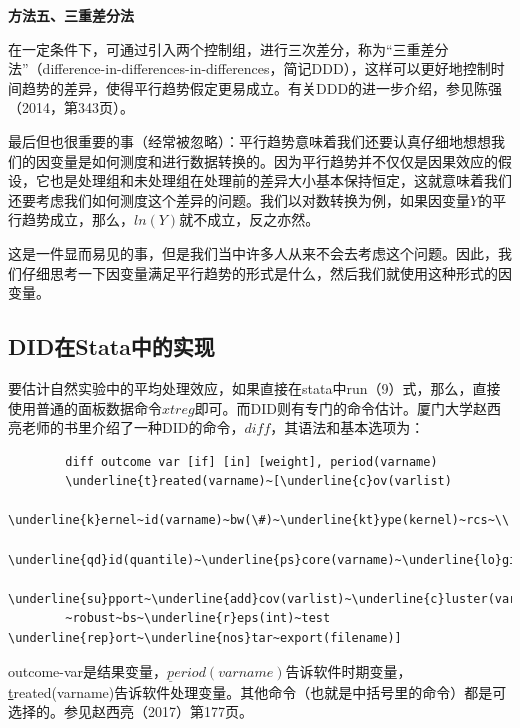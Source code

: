 \documentclass[cn,12pt,math=newtx,citestyle=gb7714-2015,bibstyle=gb7714-2015]{elegantbook}
\begin{document}
	\textbf{方法五、三重差分法}
	
	在一定条件下，可通过引入两个控制组，进行三次差分，称为“三重差分法”（difference-in-differences-in-differences，简记DDD），这样可以更好地控制时间趋势的差异，使得平行趋势假定更易成立。有关DDD的进一步介绍，参见陈强（2014，第343页）。
	
	最后但也很重要的事（经常被忽略）：平行趋势意味着我们还要认真仔细地想想我们的因变量是如何测度和进行数据转换的。因为平行趋势并不仅仅是因果效应的假设，它也是处理组和未处理组在处理前的差异大小基本保持恒定，这就意味着我们还要考虑我们如何测度这个差异的问题。我们以对数转换为例，如果因变量$Y$的平行趋势成立，那么，$ln(Y)$就不成立，反之亦然。
	
	这是一件显而易见的事，但是我们当中许多人从来不会去考虑这个问题。因此，我们仔细思考一下因变量满足平行趋势的形式是什么，然后我们就使用这种形式的因变量。
	
	\subsection{DID在Stata中的实现}
	
	要估计自然实验中的平均处理效应，如果直接在stata中run（9）式，那么，直接使用普通的面板数据命令$xtreg$即可。而DID则有专门的命令估计。厦门大学赵西亮老师的书里介绍了一种DID的命令，$diff$，其语法和基本选项为：
	\begin{lstlisting}
		diff outcome var [if] [in] [weight], period(varname)
		\underline{t}reated(varname)~[\underline{c}ov(varlist)
		\underline{k}ernel~id(varname)~bw(\#)~\underline{kt}ype(kernel)~rcs~\\
		\underline{qd}id(quantile)~\underline{ps}core(varname)~\underline{lo}git~\\
		\underline{su}pport~\underline{add}cov(varlist)~\underline{c}luster(varname)\\
		~robust~bs~\underline{r}eps(int)~test \underline{rep}ort~\underline{nos}tar~export(filename)]
	\end{lstlisting}
	
	outcome-var是结果变量，$\underline{p}eriod(varname)$告诉软件时期变量，\underline{t}reated(varname)告诉软件处理变量。其他命令（也就是中括号里的命令）都是可选择的。参见赵西亮（2017）第177页。
	
\end{document}
